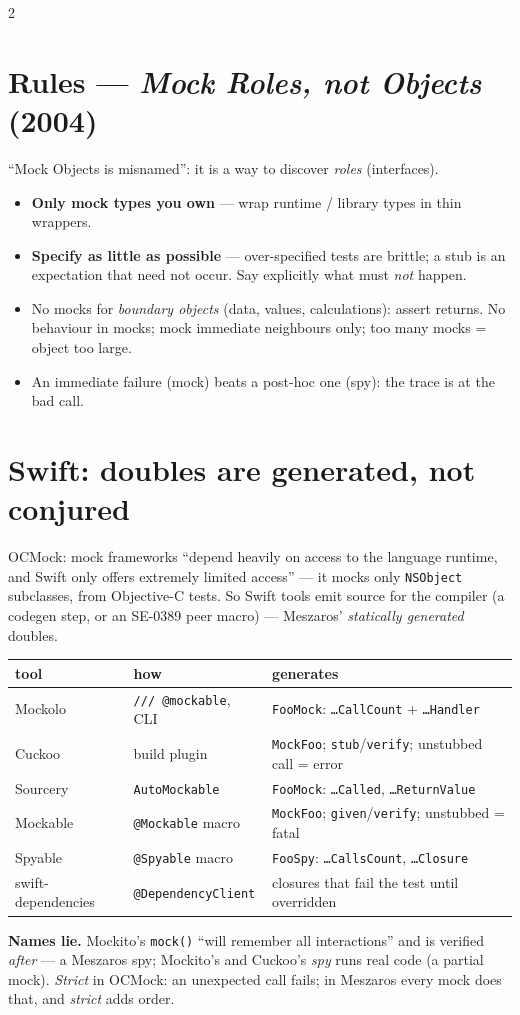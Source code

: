 \documentclass[8pt]{extarticle}
\newcommand\ct[1]{\texttt{#1}}
\begin{document}
\begin{multicols}{2}
\section{Rules — \emph{Mock Roles, not Objects} (2004)}
``Mock Objects is misnamed'': it is a way to discover \emph{roles} (interfaces).
\begin{itemize}
  \item \textbf{Only mock types you own} — wrap runtime / library types in thin wrappers.
  \item \textbf{Specify as little as possible} — over-specified tests are brittle; a stub is an
        expectation that need not occur. Say explicitly what must \emph{not} happen.
  \item No mocks for \emph{boundary objects} (data, values, calculations): assert returns. No
        behaviour in mocks; mock immediate neighbours only; too many mocks = object too large.
  \item An immediate failure (mock) beats a post-hoc one (spy): the trace is at the bad call.
\end{itemize}

\section{Swift: doubles are generated, not conjured}
OCMock: mock frameworks ``depend heavily on access to the language runtime, and Swift only offers
extremely limited access'' — it mocks only \ct{NSObject} subclasses, from Objective-C tests. So
Swift tools emit source for the compiler (a codegen step, or an SE-0389 peer macro) — Meszaros'
\emph{statically generated} doubles.
{\scriptsize\setlength{\tabcolsep}{2pt}
\begin{tabular}{@{}>{\raggedright\arraybackslash}p{18mm}>{\raggedright\arraybackslash}p{21mm}>{\raggedright\arraybackslash}p{37mm}@{}}
\toprule
\textbf{tool} & \textbf{how} & \textbf{generates}\\
\midrule
Mockolo & \ct{/// @mockable}, CLI & \ct{FooMock}: \ct{…CallCount} + \ct{…Handler}\\
Cuckoo & build plugin & \ct{MockFoo}; \ct{stub}/\ct{verify}; unstubbed call = error\\
Sourcery & \ct{AutoMockable} & \ct{FooMock}: \ct{…Called}, \ct{…ReturnValue}\\
Mockable & \ct{@Mockable} macro & \ct{MockFoo}; \ct{given}/\ct{verify}; unstubbed = fatal\\
Spyable & \ct{@Spyable} macro & \ct{FooSpy}: \ct{…CallsCount}, \ct{…Closure}\\
swift-dependencies & \ct{@DependencyClient} & closures that fail the test until overridden\\
\bottomrule
\end{tabular}}\par
\textbf{Names lie.} Mockito's \ct{mock()} ``will remember all interactions'' and is verified
\emph{after} — a Meszaros spy; Mockito's and Cuckoo's \emph{spy} runs real code (a partial mock).
\emph{Strict} in OCMock: an unexpected call fails; in Meszaros every mock does that, and
\emph{strict} adds order.


\end{multicols}
\end{document}
